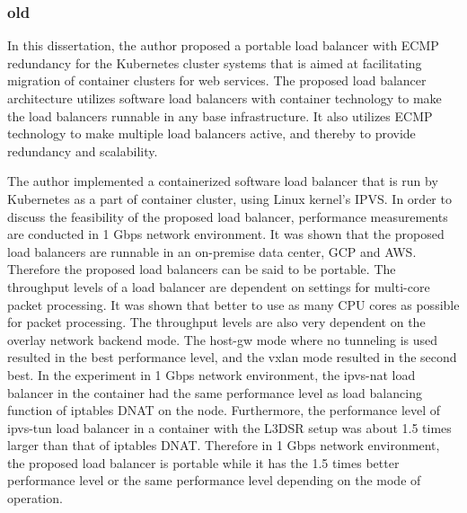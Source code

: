 \subsubsection{old}



In this dissertation, the author proposed a portable load balancer with ECMP redundancy for the Kubernetes cluster systems that is aimed at facilitating migration of container clusters for web services.
The proposed load balancer architecture utilizes software load balancers with container technology to make the load balancers runnable in any base infrastructure.
It also utilizes ECMP technology to make multiple load balancers active, and thereby to provide redundancy and scalability.

The author implemented a containerized software load balancer that is run by Kubernetes as a part of container cluster, using Linux kernel's IPVS.
In order to discuss the feasibility of the proposed load balancer, performance measurements are conducted in 1 Gbps network environment.
It was shown that the proposed load balancers are runnable in an on-premise data center, GCP and AWS.
Therefore the proposed load balancers can be said to be portable.
The throughput levels of a load balancer are dependent on settings for multi-core packet processing.
It was shown that better to use as many CPU cores as possible for packet processing.
The throughput levels are also very dependent on the overlay network backend mode.
The host-gw mode where no tunneling is used resulted in the best performance level, and the vxlan mode resulted in the second best.
In the experiment in 1 Gbps network environment, the ipvs-nat load balancer in the container had the same performance level as load balancing function of iptables DNAT on the node.
Furthermore, the performance level of ipvs-tun load balancer in a container with the L3DSR setup was about 1.5 times larger than that of iptables DNAT.
Therefore in 1 Gbps network environment, the proposed load balancer is portable while it has the 1.5 times better performance level or the same performance level depending on the mode of operation.

